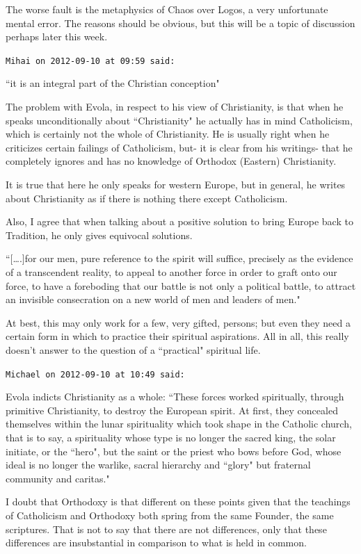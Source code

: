 \begin{footnotesize}
\begin{sffamily}
The worse fault is the metaphysics of Chaos over Logos, a very unfortunate mental error. The reasons should be obvious, but this will be a topic of discussion perhaps later this week.


\hfill

\texttt{Mihai on 2012-09-10 at 09:59 said: }

``it is an integral part of the Christian conception"

The problem with Evola, in respect to his view of Christianity, is that when he speaks unconditionally about ``Christianity" he actually has in mind Catholicism, which is certainly not the whole of Christianity. He is usually right when he criticizes certain failings of Catholicism, but- it is clear from his writings- that he completely ignores and has no knowledge of Orthodox (Eastern) Christianity.

It is true that here he only speaks for western Europe, but in general, he writes about Christianity as if there is nothing there except Catholicism. 

Also, I agree that when talking about a positive solution to bring Europe back to Tradition, he only gives equivocal solutions. 

``[….]for our men, pure reference to the spirit will suffice, precisely as the evidence of a transcendent reality, to appeal to another force in order to graft onto our force, to have a foreboding that our battle is not only a political battle, to attract an invisible consecration on a new world of men and leaders of men."

At best, this may only work for a few, very gifted, persons; but even they need a certain form in which to practice their spiritual aspirations. All in all, this really doesn't answer to the question of a ``practical" spiritual life.


\hfill

\texttt{Michael on 2012-09-10 at 10:49 said: }

Evola indicts Christianity as a whole: ``These forces worked spiritually, through primitive Christianity, to destroy the European spirit. At first, they concealed themselves within the lunar spirituality which took shape in the Catholic church, that is to say, a spirituality whose type is no longer the sacred king, the solar initiate, or the ``hero", but the saint or the priest who bows before God, whose ideal is no longer the warlike, sacral hierarchy and ``glory" but fraternal community and caritas."

I doubt that Orthodoxy is that different on these points given that the teachings of Catholicism and Orthodoxy both spring from the same Founder, the same scriptures. That is not to say that there are not differences, only that these differences are insubstantial in comparison to what is held in common.


\end{sffamily}
\end{footnotesize}
